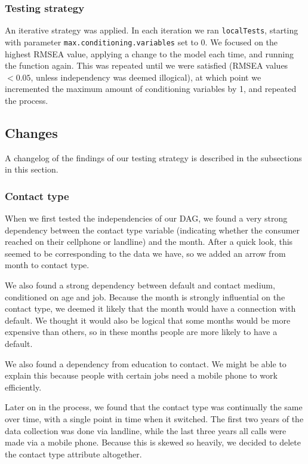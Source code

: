 \documentclass[11pt,]{article}
\begin{document}
\begin{multicols}{2}
\hypertarget{testing-strategy}{%
\subsubsection{Testing strategy}\label{testing-strategy}}

An iterative strategy was applied. In each iteration we ran
\texttt{localTests}, starting with parameter
\texttt{max.conditioning.variables} set to 0. We focused on the highest
RMSEA value, applying a change to the model each time, and running the
function again. This was repeated until we were satisfied (RMSEA values
\(<0.05\), unless independency was deemed illogical), at which point we
incremented the maximum amount of conditioning variables by 1, and
repeated the process.

\hypertarget{changes}{%
\subsection{Changes}\label{changes}}

A changelog of the findings of our testing strategy is described in the
subsections in this section.

\hypertarget{contact-type}{%
\subsubsection{Contact type}\label{contact-type}}

When we first tested the independencies of our DAG, we found a very
strong dependency between the contact type variable (indicating whether
the consumer reached on their cellphone or landline) and the month.
After a quick look, this seemed to be corresponding to the data we have,
so we added an arrow from month to contact type.

We also found a strong dependency between default and contact medium,
conditioned on age and job. Because the month is strongly influential on
the contact type, we deemed it likely that the month would have a
connection with default. We thought it would also be logical that some
months would be more expensive than others, so in these months people
are more likely to have a default.

We also found a dependency from education to contact. We might be able
to explain this because people with certain jobs need a mobile phone to
work efficiently.

Later on in the process, we found that the contact type was continually
the same over time, with a single point in time when it switched. The
first two years of the data collection was done via landline, while the
last three years all calls were made via a mobile phone. Because this is
skewed so heavily, we decided to delete the contact type attribute
altogether.


\end{multicols}
\end{document}
